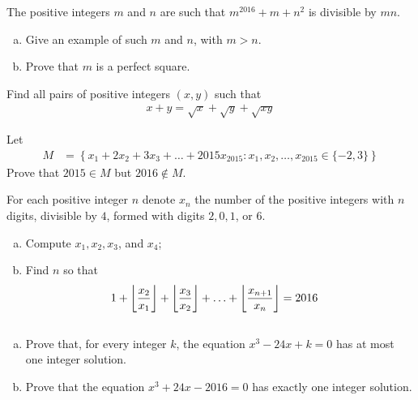 \begin{problem}
	The positive integers $m$ and $n$ are such that $m^{2016}+m+n^2$ is divisible
	by $mn$.
	\begin{enumerate}[(a)]
		\item Give an example of such $m$ and $n$, with $m > n$.
		\item Prove that $m$ is a perfect square.
	\end{enumerate}
\end{problem}

\begin{problem}
	Find all pairs of positive integers $(x,y)$ such that
	\begin{align*}
		x + y = \sqrt x + \sqrt y + \sqrt{xy}
	\end{align*}
\end{problem}

\begin{problem}
	Let
	\begin{align*}
		M &= \left\{x_1 + 2x_2 + 3x_3 + \dots + 2015x_{2015} : x_1, x_2, \dots, 	x_{2015} \in \{-2, 3\}\right\}
	\end{align*}
	Prove that $2015 \in M$ but $2016 \not \in M$.
\end{problem}

\begin{problem}
	For each positive integer $n$ denote $x_n$ the number of the positive
	integers with $n$ digits, divisible by $4$, formed with digits $2, 0, 1$, or $6$.
	\begin{enumerate}[(a)]
		\item Compute $x_1, x_2, x_3$, and $x_4$;
		\item Find $n$ so that
		\begin{align*}
			1 + \left\lfloor{\frac{x_2}{x_1}}\right\rfloor+ \left\lfloor{\frac{x_3}{x_2}}\right\rfloor+ \ldots +\left\lfloor{\frac{x_{n+1}}{x_n}}\right\rfloor
				& = 2016
		\end{align*}
	\end{enumerate}
\end{problem}

\begin{problem}
	$ $
	\begin{enumerate}[(a)]
		\item Prove that, for every integer $k$, the equation $x^3 - 24x + k = 0$ has at most one integer solution.
		\item Prove that the equation $x^3 + 24x - 2016 = 0$ has exactly one integer solution.
	\end{enumerate}
\end{problem}

